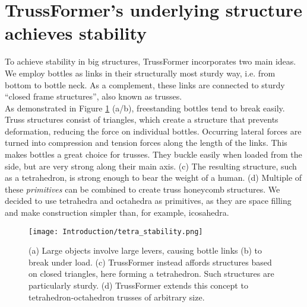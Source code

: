 \section{TrussFormer’s underlying structure achieves stability}
To achieve stability in big structures, TrussFormer incorporates two main ideas. We employ bottles as links in their structurally most sturdy way, i.e. from bottom to bottle neck. As a complement, these links are connected to sturdy ``closed frame structures'', also known as trusses.\\
As demonstrated in Figure \ref{fig:tetra_stability} (a/b), freestanding bottles tend to break easily. Truss structures consist of triangles, which create a structure that prevents deformation, reducing the force on individual bottles. Occurring lateral forces are turned into compression and tension forces along the length of the links. This makes bottles a great choice for trusses. They buckle easily when loaded from the side, but are very strong along their main axis. (c) The resulting structure, such as a tetrahedron, is strong enough to bear the weight of a human. (d) Multiple of these \textit{primitives} can be combined to create truss honeycomb structures. We decided to use tetrahedra and octahedra as primitives, as they are space filling and make construction simpler than, for example, icosahedra.
\begin{figure}[h!]
    \texttt{[image: Introduction/tetra\_stability.png]}
    \centering
    \caption{(a) Large objects involve large levers, causing bottle links (b) to break under load. (c) TrussFormer instead affords structures based on closed triangles, here forming a tetrahedron. Such structures are particularly sturdy. (d) TrussFormer extends this concept to tetrahedron-octahedron trusses of arbitrary size.}
    \label{fig:tetra_stability}
\end{figure}

